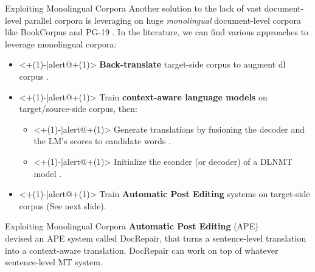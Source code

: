 \begin{frame}{Exploiting Monolingual Corpora}
	Another solution to the lack of vast document-level parallel corpora is leveraging on huge \textit{monolingual} document-level corpora like BookCorpus \cite{zhu_aligning_2015} and PG-19 \cite{rae_compressive_2019}. In the literature, we can find various approaches to leverage monolingual corpora:
	\begin{itemize}
		\item<+(1)-|alert@+(1)> \textbf{Back-translate} target-side corpus to augment dl corpus \cite{sugiyama_data_2019}.
		\item<+(1)-|alert@+(1)> Train \textbf{context-aware language models} on target/source-side corpus, then:
		\begin{itemize}
			\item<+(1)-|alert@+(1)> Generate translations by fusioning the decoder and the LM's scores to candidate words  \cite{martinez_garcia_context-aware_2019}.
			\item<+(1)-|alert@+(1)> Initialize the econder (or decoder) of a DLNMT model \cite{li_pretrained_2019}.
		\end{itemize}  
		\item<+(1)-|alert@+(1)> Train \textbf{Automatic Post Editing} systems on target-side corpus (See next slide).
	\end{itemize}
\end{frame}

\begin{frame}{Exploiting Monolingual Corpora}
	\textbf{Automatic Post Editing} (APE)\\
	\cite{voita_context-aware_2019} devised an APE system called DocRepair, that turns a sentence-level translation into a context-aware translation. DocRepair can work on top of whatever sentence-level MT system.
\end{frame}


